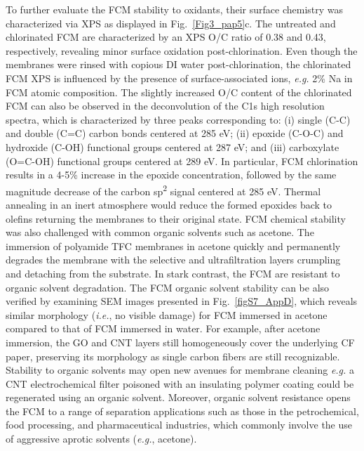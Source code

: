 To further evaluate the FCM stability to oxidants, their surface chemistry was characterized via XPS as displayed in Fig.~\ref{Fig3_pap5}c. The untreated and chlorinated FCM are characterized by an XPS O/C ratio of 0.38 and 0.43, respectively, revealing minor surface oxidation post-chlorination. Even though the membranes were rinsed with copious DI water post-chlorination, the chlorinated FCM XPS is influenced by the presence of surface-associated ions, \textit{e.g.} 2\% Na in FCM atomic composition. The slightly increased O/C content of the chlorinated FCM can also be observed in the deconvolution of the C1s high resolution spectra, which is characterized by three peaks corresponding to: (i) single (C-C) and double (C=C) carbon bonds centered at 285 eV; (ii) epoxide (C-O-C) and hydroxide (C-OH) functional groups centered at 287 eV; and (iii) carboxylate (O=C-OH) functional groups centered at 289 eV. In particular, FCM chlorination results in a 4-5\% increase in the epoxide concentration, followed by the same magnitude decrease of the carbon sp\textsuperscript{2} signal centered at 285 eV.  Thermal annealing in an inert atmosphere would reduce the formed epoxides back to olefins returning the membranes to their original state.
FCM chemical stability was also challenged with common organic solvents such as acetone. The immersion of polyamide TFC membranes in acetone quickly and permanently degrades the membrane with the selective and ultrafiltration layers crumpling and detaching from the substrate. In stark contrast, the FCM are resistant to organic solvent degradation.  The FCM organic solvent stability can be also verified by examining SEM images presented in Fig.~\ref{figS7_AppD}, which reveals similar morphology (\textit{i.e.}, no visible damage) for FCM immersed in acetone compared to that of FCM immersed in water. For example, after acetone immersion, the GO and CNT layers still homogeneously cover the underlying CF paper, preserving its morphology as single carbon fibers are still recognizable. Stability to organic solvents may open new avenues for membrane cleaning \textit{e.g.} a CNT electrochemical filter poisoned with an insulating polymer coating could be regenerated using an organic solvent.\cite{gao2013electrocatalysis} Moreover, organic solvent resistance opens the FCM to a range of separation applications such as those in the petrochemical, food processing, and pharmaceutical industries, which commonly involve the use of aggressive aprotic solvents (\textit{e.g.}, acetone).\cite{chisca2015crosslinked}


